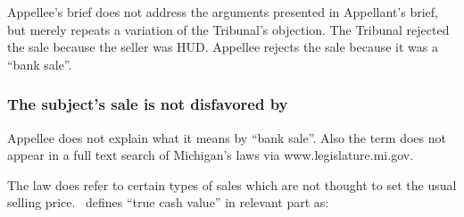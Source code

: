 \documentclass[12pt,\documentclassflag]{michiganCourtOfAppealsBrief}
\begin{document}
Appellee's brief does not address the arguments presented in Appellant's brief, but merely repeats a variation of the Tribunal's objection. The Tribunal rejected the sale because the seller was HUD. Appellee rejects the sale because it was a ``bank sale''.

\subsubsection{The subject's sale is not disfavored by \protect\cite{MCL 211.27(1)}}


Appellee does not explain what it means by ``bank sale''. Also the term does not appear in a full text search of Michigan's laws via www.legislature.mi.gov.

The law does refer to certain types of sales which are not thought to set the usual selling price. \cite[s]{MCL 211.27(1)}\ defines ``true cash value'' in relevant part as:
\end{document}
